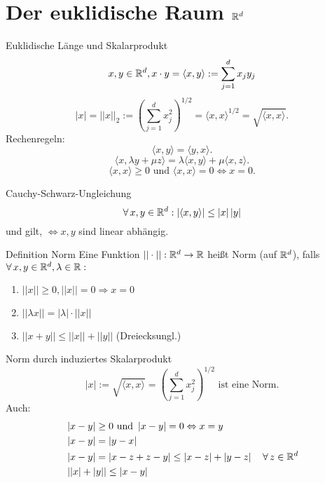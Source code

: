 \documentclass[main.tex]{subfiles}
\begin{document}
\section*{Der euklidische Raum \(\mathbb{R}^d\)}
\begin{karte}{Euklidische Länge und Skalarprodukt}
    \[ x,y \in\mathbb{R}^d, x\cdot y 
    = \langle x,y\rangle 
    := \sum_{j=1}^{d}x_j y_j \]
    \[ |x| = ||x||_2 
    := {\left(\sum_{j=1}^{d} x_j^2 \right)}^{1/2} 
    = \langle x,x\rangle^{1/2} 
    = \sqrt{\langle x,x\rangle}. \]
    Rechenregeln:
    \[ \langle x,y \rangle = \langle y,x \rangle. \]
    \[ \langle x, \lambda y + \mu z \rangle 
    = \lambda \langle x,y \rangle + \mu \langle x,z \rangle. \]
    \[ \langle x,x \rangle \geq 0 \text{ und } 
    \langle x,x \rangle = 0 
    \Leftrightarrow x = 0. \]
\end{karte}
\begin{karte}{Cauchy-Schwarz-Ungleichung}
    \[ \forall x,y\in\R^d: 
    \abs{\langle x,y\rangle}
    \leq \abs{x}\abs{y}\]
    und \gqq{\(=\)} gilt, 
    \( \Leftrightarrow x,y \) 
    sind linear abhängig.
\end{karte}
\begin{karte}{Definition Norm}
    Eine Funktion \( ||\cdot || : 
    \mathbb{R}^d \rightarrow \mathbb{R} \) heißt Norm 
    (auf \( \mathbb{R}^d \)), falls 
    \( \forall x,y\in\R^d, \lambda\in\R: \)
	\begin{enumerate}
        \item \( ||x||\geq 0, 
        ||x|| = 0 \Rightarrow x = 0 \)
        \item \( ||\lambda x|| 
        = |\lambda|\cdot||x|| \)
        \item \( ||x+y|| 
        \leq ||x|| + ||y|| \) (Dreiecksungl.)
	\end{enumerate}
\end{karte}
\begin{karte}{Norm durch induziertes Skalarprodukt}
    \[ |x| := \sqrt{\langle x,x\rangle} 
    = {\left(\sum_{j=1}^{d} x_j^2\right)}^{1/2} 
    \text{ ist eine Norm}. \]
    Auch:
	\begin{align*}
        &\abs{x - y} \geq 0 \text{ und } 
        \abs{x - y} = 0 \Leftrightarrow x = y\\
		&\abs{x - y} = \abs{y - x}\\
        &\abs{x - y} = \abs{x-z + z-y} 
        \leq \abs{x - z} + \abs{y - z} 
        \quad \forall z \in \R^d\\
		&\abs{\abs{x} + \abs{y}} \leq \abs{x - y}
	\end{align*}
\end{karte}
\end{document}
